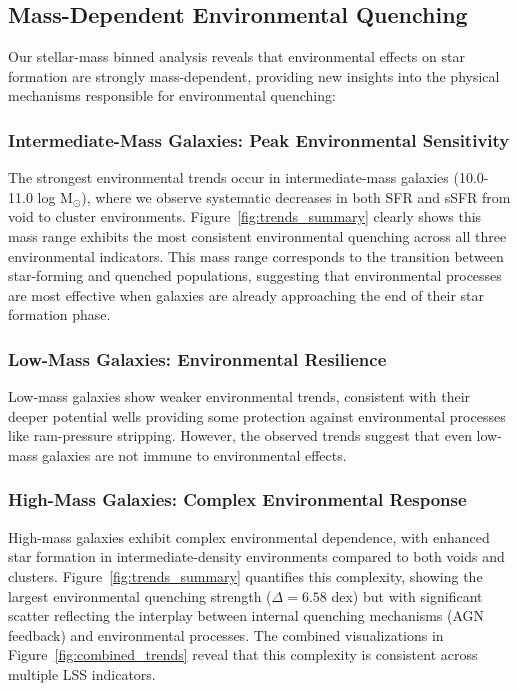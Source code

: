 \documentclass[twocolumn]{aastex701}
\begin{document}
\subsection{Mass-Dependent Environmental Quenching}

Our stellar-mass binned analysis reveals that environmental effects on star formation are strongly mass-dependent, providing new insights into the physical mechanisms responsible for environmental quenching:

\subsubsection{Intermediate-Mass Galaxies: Peak Environmental Sensitivity}
The strongest environmental trends occur in intermediate-mass galaxies (10.0-11.0 log M$_\odot$), where we observe systematic decreases in both SFR and sSFR from void to cluster environments. Figure~\ref{fig:trends_summary} clearly shows this mass range exhibits the most consistent environmental quenching across all three environmental indicators. This mass range corresponds to the transition between star-forming and quenched populations, suggesting that environmental processes are most effective when galaxies are already approaching the end of their star formation phase.

\subsubsection{Low-Mass Galaxies: Environmental Resilience}
Low-mass galaxies show weaker environmental trends, consistent with their deeper potential wells providing some protection against environmental processes like ram-pressure stripping. However, the observed trends suggest that even low-mass galaxies are not immune to environmental effects.

\subsubsection{High-Mass Galaxies: Complex Environmental Response}
High-mass galaxies exhibit complex environmental dependence, with enhanced star formation in intermediate-density environments compared to both voids and clusters. Figure~\ref{fig:trends_summary} quantifies this complexity, showing the largest environmental quenching strength ($\Delta = 6.58$ dex) but with significant scatter reflecting the interplay between internal quenching mechanisms (AGN feedback) and environmental processes. The combined visualizations in Figure~\ref{fig:combined_trends} reveal that this complexity is consistent across multiple LSS indicators.
\end{document}
